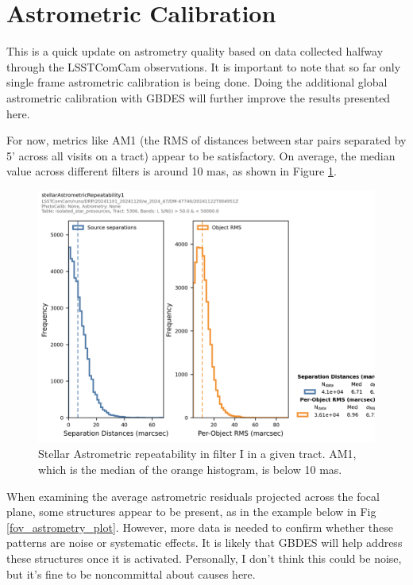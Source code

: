 \section{Astrometric Calibration}
\label{sec:astrometric_calibration}


This is a quick update on astrometry quality based on data collected halfway through the LSSTComCam observations. It is important to note that so far only single frame astrometric calibration is being done. Doing the additional global astrometric calibration with GBDES will further improve the results presented here.


For now, metrics like AM1 (the RMS of distances between star pairs separated by 5’ across all visits on a tract) appear to be satisfactory. On average, the median value across different filters is around 10 mas, as shown in Figure \ref{AM1_plot}.

\begin{figure}
        \centering
        \includegraphics[scale=0.47]{figures/11d0c9f8-45f6-4bf2-871a-56e00e62060c}
        \caption{\small Stellar Astrometric repeatability in filter I in a given tract. AM1, which is the median of the orange histogram,  is below 10 mas.}
        \label{AM1_plot}
\end{figure}

When examining the average astrometric residuals projected across the focal plane, some structures appear to be present, as in the example below in Fig \ref{fov_astrometry_plot}. However, more data is needed to confirm whether these patterns are noise or systematic effects. It is likely that GBDES will help address these structures once it is activated. Personally, I don’t think this could be noise, but it’s fine to be noncommittal about causes here.

